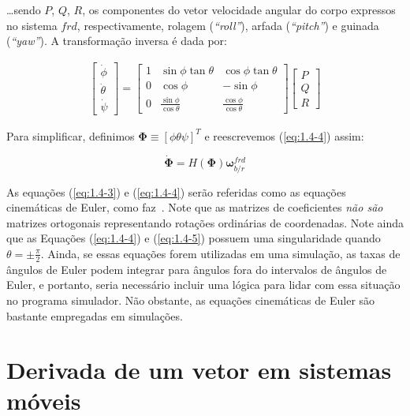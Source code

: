 \ldots sendo \(P\), \(Q\), \(R\), os componentes do vetor velocidade angular do corpo expressos no sistema \(frd\), respectivamente, rolagem (\emph{``roll''}), arfada (\emph{``pitch''}) e guinada (\emph{``yaw''}). A transformação inversa é dada por:

\begin{align}\label{eq:1.4-4}%
    \begin{bmatrix}
        \dot\phi \\
        \dot\theta \\
        \dot\psi
    \end{bmatrix}
    =
    \begin{bmatrix}
        1 & \sin{\phi}\tan{\theta} & \cos{\phi}\tan{\theta} \\
        0 & \cos{\phi} & -\sin{\phi} \\
        0 & \frac{\sin{\phi}}{\cos{\theta}} & \frac{\cos{\phi}}{\cos{\theta}}
    \end{bmatrix}
    \begin{bmatrix}
        P \\ Q \\ R
    \end{bmatrix}
\end{align}

Para simplificar, definimos \(\mathbf{\Phi} \equiv \left[\phi \theta \psi \right]^T \) e reescrevemos  (\ref{eq:1.4-4}) assim:

\begin{equation}\label{eq:1.4-5}%
    \dot{\mathbf{\Phi}} = H \left( \mathbf{\Phi} \right) \mathbf{\omega}^{frd}_{b/r}
\end{equation}

As equações (\ref{eq:1.4-3}) e (\ref{eq:1.4-4}) serão referidas como as equações cinemáticas de Euler, como faz~\cite{Stevens2016}. Note que as matrizes de coeficientes \emph{não são} matrizes ortogonais representando rotações ordinárias de coordenadas. Note ainda que as Equações (\ref{eq:1.4-4}) e (\ref{eq:1.4-5}) possuem uma singularidade quando  \(\theta = \pm \frac{\pi}{2}\). Ainda, se essas equações forem utilizadas em uma simulação, as taxas de ângulos de Euler podem integrar para ângulos fora do intervalos de ângulos de Euler, e portanto, seria necessário incluir uma lógica para lidar com essa situação no programa simulador. Não obstante, as equações cinemáticas de Euler são bastante empregadas em simulações.

\section{Derivada de um vetor em sistemas móveis}

